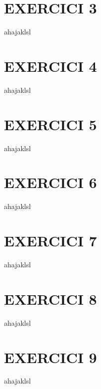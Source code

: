 \documentclass[a4paper, 11pt]{article}
\begin{document}

\section*{EXERCICI 3}
\noindent ahajaklsl
\vspace{5mm}


\section*{EXERCICI 4}
\noindent ahajaklsl
\vspace{5mm}


\section*{EXERCICI 5}
\noindent ahajaklsl
\vspace{5mm}


\section*{EXERCICI 6}
\noindent ahajaklsl
\vspace{5mm}


\section*{EXERCICI 7}
\noindent ahajaklsl
\vspace{5mm}


\section*{EXERCICI 8}
\noindent ahajaklsl
\vspace{5mm}


\section*{EXERCICI 9}
\noindent ahajaklsl
\vspace{5mm}
\end{document}
